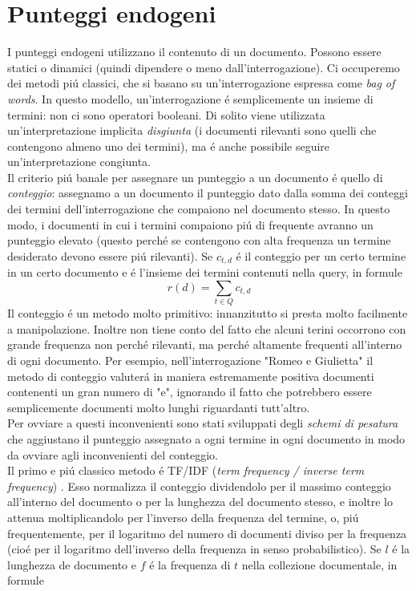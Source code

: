 \section{Punteggi endogeni}
I punteggi endogeni utilizzano il contenuto di un documento. Possono essere statici o dinamici (quindi dipendere o meno dall'interrogazione). Ci occuperemo dei metodi piú classici, che si basano su un'interrogazione espressa come \textit{bag of words}. In questo modello, un'interrogazione é semplicemente un insieme di termini: non ci sono operatori booleani. Di solito viene utilizzata un'interpretazione implicita \textit{disgiunta} (i documenti rilevanti sono quelli che contengono almeno uno dei termini), ma é anche possibile seguire un'interpretazione congiunta.\\
Il criterio piú banale per assegnare un punteggio a un documento é quello di \textit{conteggio}: assegnamo a un documento il punteggio dato dalla somma dei conteggi dei termini dell'interrogazione che compaiono nel documento stesso. In questo modo, i documenti in cui i termini compaiono piú di frequente avranno un punteggio elevato (questo perché se contengono con alta frequenza un termine desiderato devono essere piú rilevanti). Se $c_{t, d}$ é il conteggio per un certo termine in un certo documento e  é l'insieme dei termini contenuti nella query, in formule
\begin{equation*}
    r(d) = \sum_{t \in Q}{c_{t, d}}
\end{equation*}
Il conteggio é un metodo molto primitivo: innanzitutto si presta molto facilmente a manipolazione. Inoltre non tiene conto del fatto che alcuni terini occorrono con grande frequenza non perché rilevanti, ma perché altamente frequenti all'interno di ogni documento. Per esempio, nell'interrogazione "Romeo e Giulietta" il metodo di conteggio valuterá in maniera estremamente positiva documenti contenenti un gran numero di "e", ignorando il fatto che potrebbero essere semplicemente documenti molto lunghi riguardanti tutt'altro.\\
Per ovviare a questi inconvenienti sono stati sviluppati degli \textit{schemi di pesatura} che aggiustano il punteggio assegnato a ogni termine in ogni documento in modo da ovviare agli inconvenienti del conteggio.\\
Il primo e piú classico metodo é TF/IDF (\textit{term frequency / inverse term frequency}) %
. Esso normalizza il conteggio dividendolo per il massimo conteggio all'interno del documento o per la lunghezza del documento stesso, e inoltre lo attenua moltiplicandolo per l'inverso della frequenza del termine, o, piú frequentemente, per il logaritmo del numero di documenti diviso per la frequenza (cioé per il logaritmo dell'inverso della frequenza in senso probabilistico). Se $l$ é la lunghezza de documento e $f$ é la frequenza di $t$ nella collezione documentale, in formule
